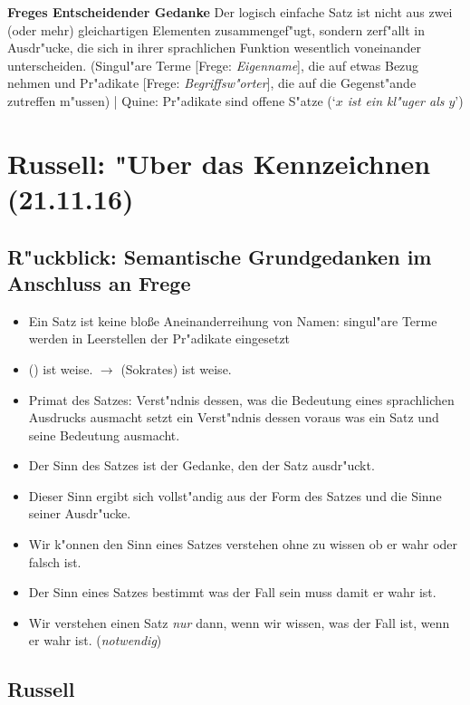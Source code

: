 \documentclass[emulatestandardclasses]{scrartcl}
\begin{document}
\textbf{Freges Entscheidender Gedanke} Der logisch einfache Satz ist nicht aus zwei (oder mehr) gleichartigen Elementen zusammengef"ugt, sondern zerf"allt in Ausdr"ucke, die sich in ihrer sprachlichen Funktion wesentlich voneinander unterscheiden. (Singul"are Terme [Frege: \emph{Eigenname}], die auf etwas Bezug nehmen und Pr"adikate [Frege: \emph{Begriffsw"orter}], die auf die Gegenst"ande zutreffen m"ussen) | Quine: Pr"adikate sind offene S"atze (`\emph{$x$ ist ein kl"uger als $y$}')

\section{Russell: "Uber das Kennzeichnen\\(21.11.16)}

\subsection{R"uckblick: Semantische Grundgedanken im Anschluss an Frege}

\begin{itemize}
  \item Ein Satz ist keine blo\ss e Aneinanderreihung von Namen: singul"are Terme werden in Leerstellen der Pr"adikate eingesetzt
  \item () ist weise. $\rightarrow$ (Sokrates) ist weise.
  \item Primat des Satzes: Verst"ndnis dessen, was die Bedeutung eines sprachlichen Ausdrucks ausmacht setzt ein Verst"ndnis dessen voraus was ein Satz und seine Bedeutung ausmacht.
  \item Der Sinn des Satzes ist der Gedanke, den der Satz ausdr"uckt.
  \item Dieser Sinn ergibt sich vollst"andig aus der Form des Satzes und die Sinne seiner Ausdr"ucke.
  \item Wir k"onnen den Sinn eines Satzes verstehen ohne zu wissen ob er wahr oder falsch ist.
  \item Der Sinn eines Satzes bestimmt was der Fall sein muss damit er wahr ist.
  \item Wir verstehen einen Satz \emph{nur} dann, wenn wir wissen, was der Fall ist, wenn er wahr ist. (\emph{notwendig})
\end{itemize}

\subsection{Russell}
\end{document}
